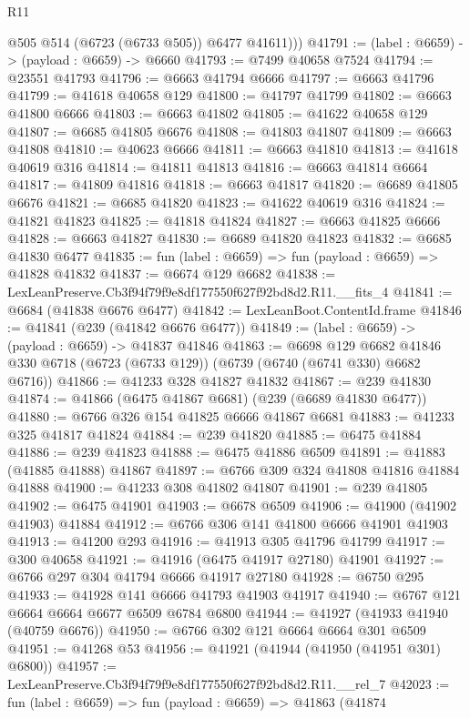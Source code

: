 \begin{lexlean}{R11}
\begin{coremodule}
          @505
          @514
          (@6723 (@6733 @505))
          @6477
          @41611)))
@41791 := (label : @6659) -> (payload : @6659) -> @6660
@41793 := @7499 @40658 @7524
@41794 := @23551 @41793
@41796 := @6663 @41794 @6666
@41797 := @6663 @41796
@41799 := @41618 @40658 @129
@41800 := @41797 @41799
@41802 := @6663 @41800 @6666
@41803 := @6663 @41802
@41805 := @41622 @40658 @129
@41807 := @6685 @41805 @6676
@41808 := @41803 @41807
@41809 := @6663 @41808
@41810 := @40623 @6666
@41811 := @6663 @41810
@41813 := @41618 @40619 @316
@41814 := @41811 @41813
@41816 := @6663 @41814 @6664
@41817 := @41809 @41816
@41818 := @6663 @41817
@41820 := @6689 @41805 @6676
@41821 := @6685 @41820
@41823 := @41622 @40619 @316
@41824 := @41821 @41823
@41825 := @41818 @41824
@41827 := @6663 @41825 @6666
@41828 := @6663 @41827
@41830 := @6689 @41820 @41823
@41832 := @6685 @41830 @6477
@41835 := fun (label : @6659) => fun (payload : @6659) => @41828 @41832
@41837 := @6674 @129 @6682
@41838 := LexLeanPreserve.Cb3f94f79f9e8df177550f627f92bd8d2.R11.__fits_4
@41841 := @6684 (@41838 @6676 @6477)
@41842 := LexLeanBoot.ContentId.frame
@41846 := @41841 (@239 (@41842 @6676 @6477))
@41849 := (label : @6659) -> (payload : @6659) -> @41837 @41846
@41863 := @6698
    @129
    @6682
    @41846
    @330
    @6718
    (@6723 (@6733 @129))
    (@6739 (@6740 (@6741 @330) @6682 @6716))
@41866 := @41233 @328 @41827 @41832
@41867 := @239 @41830
@41874 := @41866 (@6475 @41867 @6681) (@239 (@6689 @41830 @6477))
@41880 := @6766 @326 @154 @41825 @6666 @41867 @6681
@41883 := @41233 @325 @41817 @41824
@41884 := @239 @41820
@41885 := @6475 @41884
@41886 := @239 @41823
@41888 := @6475 @41886 @6509
@41891 := @41883 (@41885 @41888) @41867
@41897 := @6766 @309 @324 @41808 @41816 @41884 @41888
@41900 := @41233 @308 @41802 @41807
@41901 := @239 @41805
@41902 := @6475 @41901
@41903 := @6678 @6509
@41906 := @41900 (@41902 @41903) @41884
@41912 := @6766 @306 @141 @41800 @6666 @41901 @41903
@41913 := @41200 @293
@41916 := @41913 @305 @41796 @41799
@41917 := @300 @40658
@41921 := @41916 (@6475 @41917 @27180) @41901
@41927 := @6766 @297 @304 @41794 @6666 @41917 @27180
@41928 := @6750 @295
@41933 := @41928 @141 @6666 @41793 @41903 @41917
@41940 := @6767 @121 @6664 @6664 @6677 @6509 @6784 @6800
@41944 := @41927 (@41933 @41940 (@40759 @6676))
@41950 := @6766 @302 @121 @6664 @6664 @301 @6509
@41951 := @41268 @53
@41956 := @41921 (@41944 (@41950 (@41951 @301) @6800))
@41957 := LexLeanPreserve.Cb3f94f79f9e8df177550f627f92bd8d2.R11.__rel_7
@42023 := fun (label : @6659) =>
  fun (payload : @6659) =>
  @41863
    (@41874

\end{coremodule}
\end{lexlean}
